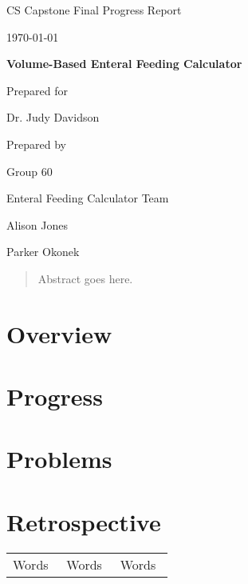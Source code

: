 \documentclass[onecolumn, draftclsnofoot,10pt, compsoc]{IEEEtran}
\def \CapstoneTeamName{		Enteral Feeding Calculator Team}
\def \CapstoneTeamNumber{		60}
\def \GroupMemberOne{			Alison Jones}
\def \GroupMemberTwo{			Parker Okonek}
\def \CapstoneProjectName{		Volume-Based Enteral Feeding Calculator}
\def \CapstoneSponsorPerson{		Dr. Judy Davidson}
\def \DocType{
				Final Progress Report
				}
\newcommand{\NameSigPair}[1]{\par
\makebox[2.75in][r]{#1} \hfil 	\makebox[3.25in]{\makebox[2.25in]{\hrulefill} \hfill		\makebox[.75in]{\hrulefill}}
\par\vspace{-12pt} \textit{\tiny\noindent
\makebox[2.75in]{} \hfil		\makebox[3.25in]{\makebox[2.25in][r]{Signature} \hfill	\makebox[.75in][r]{Date}}}}
\renewcommand{\NameSigPair}[1]{#1}
\begin{document}
\begin{titlepage}
    \begin{singlespace}
        \hfill 
        \par\vspace{.2in}
        \centering
        \scshape{
            \huge CS Capstone \DocType \par
            {\large\today}\par
            \vspace{.5in}
            \textbf{\Huge\CapstoneProjectName}\par
            \vfill
            {\large Prepared for}\par
            {\Large\NameSigPair{\CapstoneSponsorPerson}\par}
            {\large Prepared by }\par
            Group\CapstoneTeamNumber\par
            \CapstoneTeamName\par 
            \vspace{5pt}
            {\Large
                \NameSigPair{\GroupMemberOne}\par
                \NameSigPair{\GroupMemberTwo}\par
            }
            \vspace{20pt}
        }
        \begin{abstract}%
        Abstract goes here.
        \end{abstract}     
    \end{singlespace}
\end{titlepage}
\newpage
{}
\clearpage
\section{Overview}
\section{Progress}
\section{Problems}
\section{Retrospective}
\begin{tabular}{p{0.3\linewidth} p{0.3\linewidth} p{0.3\linewidth}}
Words & Words & Words
\end{tabular}
\end{document}
